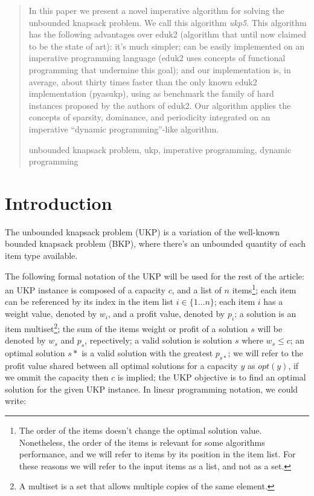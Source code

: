 \documentclass[runningheads,a4paper]{llncs}
\newcommand{\keywords}[1]{\par\addvspace\baselineskip
\noindent\keywordname\enspace\ignorespaces#1}
\begin{document}
\begin{abstract}
In this paper we present a novel imperative algorithm for solving the unbounded knapsack problem. We call this algorithm \emph{ukp5}. This algorithm has the following advantages over eduk2 (algorithm that until now claimed to be the state of art): it's much simpler; can be easily implemented on an imperative programming language (eduk2 uses concepts of functional programming that undermine this goal); and our implementation is, in average, about thirty times faster than the only known eduk2 implementation (pyasukp), using as benchmark the family of hard instances proposed by the authors of eduk2. Our algorithm applies the concepts of sparsity, dominance, and periodicity integrated on an imperative ``dynamic programming''-like algorithm.
\keywords{unbounded knapsack problem, ukp, imperative programming, dynamic programming}
\end{abstract}

\section{Introduction}

The unbounded knapsack problem (UKP) is a variation of the well-known bounded knapsack problem (BKP), where there's an unbounded quantity of each item type available.

The following formal notation of the UKP will be used for the rest of the article: an UKP instance is composed of a capacity \(c\), and a list of \(n\) items\footnote{The order of the items doesn't change the optimal solution value. Nonetheless, the order of the items is relevant for some algorithms performance, and we will refer to items by its position in the item list. For these reasons we will refer to the input items as a list, and not as a set.}; each item can be referenced by its index in the item list \(i \in \{1\dots n\}\); each item \(i\) has a weight value, denoted by \(w_i\), and a profit value, denoted by \(p_i\); a solution is an item multiset\footnote{A multiset is a set that allows multiple copies of the same element.}; the sum of the items weight or profit of a solution \(s\) will be denoted by \(w_s\) and \(p_s\), repectively; a valid solution is solution \(s\) where \(w_s \leq c\); an optimal solution \(s*\) is a valid solution with the greatest \(p_{s*}\); we will refer to the profit value shared between all optimal solutions for a capacity \(y\) as \(opt(y)\), if we ommit the capacity then \(c\) is implied; the UKP objective is to find an optimal solution for the given UKP instance. In linear programming notation, we could write:
\end{document}
